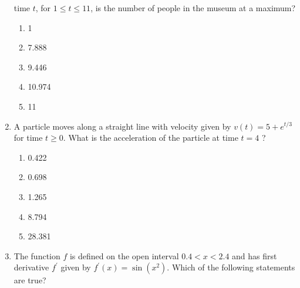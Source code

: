\documentclass{article}
\begin{document}
\begin{enumerate}
\begin{minipage}[t]{\linewidth}
time \(t\), for \(1 \leq t \leq 11\), is the number of people in the
museum at a maximum?
\vspace{1em}
		\begin{enumerate}
		\itemsep1em
			\item 1
			\item 7.888
			\item 9.446
			\item 10.974
			\item 11
		\end{enumerate}
	\end{minipage}
	\item
	\begin{minipage}[t]{\linewidth}
		A particle moves along a straight line with velocity given by
\(v(t)=5+e^{t / 3}\) for time \(t \geq 0\). What is the acceleration of
the particle at time \(t=4\) ?
\vspace{1em}
		\begin{enumerate}
		\itemsep1em
			\item 0.422
			\item 0.698
			\item 1.265
			\item 8.794
			\item 28.381
		\end{enumerate}
	\end{minipage}
	\item
	\begin{minipage}[t]{\linewidth}
		The function \(f\) is defined on the open interval \(0.4<x<2.4\) and has
first derivative \(f^{\prime}\) given by
\(f^{\prime}(x)=\sin \left(x^{2}\right)\). Which of the following
statements are true?


\end{minipage}
\end{enumerate}
\end{document}
